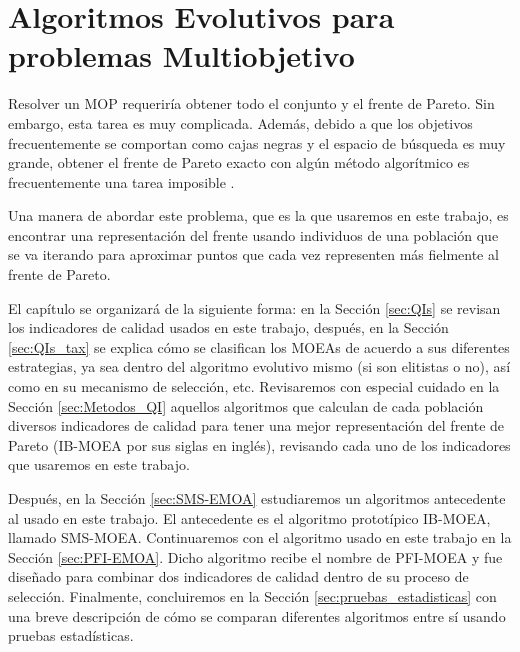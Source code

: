 

\chapter{Algoritmos Evolutivos para problemas Multiobjetivo}

Resolver un MOP requeriría obtener todo el conjunto y el frente de Pareto. Sin embargo, esta tarea es muy complicada. Además, debido a que los objetivos frecuentemente se comportan como cajas negras y el espacio de búsqueda es muy grande, obtener el frente de Pareto exacto con algún método algorítmico es frecuentemente una tarea imposible \cite{SMS-EMOA}. 

Una manera de abordar este problema, que es la que usaremos en este trabajo, es encontrar una representación del frente usando individuos de una población que se va iterando para aproximar puntos que cada vez representen más fielmente al frente de Pareto.

El capítulo se organizará de la siguiente forma: en la Sección \ref{sec:QIs} se revisan los indicadores de calidad usados en este trabajo, después, en la Sección \ref{sec:QIs_tax} se explica cómo se clasifican los MOEAs de acuerdo a sus diferentes estrategias, ya sea dentro del algoritmo evolutivo mismo (si son elitistas o no), así como en su mecanismo de selección, etc. Revisaremos con especial cuidado en la Sección \ref{sec:Metodos_QI} aquellos algoritmos que calculan de cada población diversos indicadores de calidad para tener una mejor representación del frente de Pareto (IB-MOEA por sus siglas en inglés), revisando cada uno de los indicadores que usaremos en este trabajo. 

Después, en la Sección \ref{sec:SMS-EMOA} estudiaremos un algoritmos antecedente al usado en este trabajo. El antecedente es el algoritmo prototípico IB-MOEA, llamado SMS-MOEA. Continuaremos con el algoritmo usado en este trabajo en la Sección \ref{sec:PFI-EMOA}. Dicho algoritmo recibe el nombre de PFI-MOEA y fue diseñado para combinar dos indicadores de calidad dentro de su proceso de selección. Finalmente, concluiremos en la Sección \ref{sec:pruebas_estadisticas} con una breve descripción de cómo se comparan diferentes algoritmos entre sí usando pruebas estadísticas.

